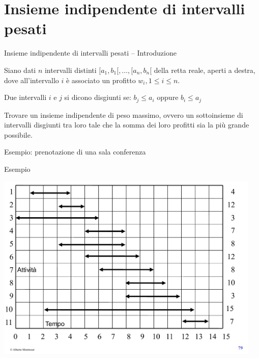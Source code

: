 \section{Insieme indipendente di intervalli pesati}

\begin{frame}{Insieme indipendente di intervalli pesati -- Introduzione}

\vspace{-6pt}
\begin{myboxtitle}[Input]
Siano dati $n$ intervalli distinti $[a_1, b_1[, \ldots, [a_n,b_n[$ della retta reale, aperti a destra, dove all'intervallo $i$ è associato un profitto $w_i, 1 \leq i \leq n$. 
\end{myboxtitle}

\begin{myboxtitle}
Due intervalli $i$ e $j$ si dicono \alert{disgiunti} se:  $b_j \leq a_i$  oppure  $b_i \leq a_j$
\end{myboxtitle}

\begin{myboxtitle}[Problema]
Trovare un \alert{insieme indipendente di peso massimo}, ovvero un sottoinsieme di intervalli disgiunti tra loro tale che la somma dei loro profitti sia la più
grande possibile.
\BI
\item Esempio: prenotazione di una sala conferenza
\EI
\end{myboxtitle}

\end{frame}

\begin{frame}{Esempio}

\vspace{-12pt}
\begin{center}
\includegraphics[width=0.95\textwidth,page=1]{intervalli-esempio.pdf}
\end{center}

\end{frame}

